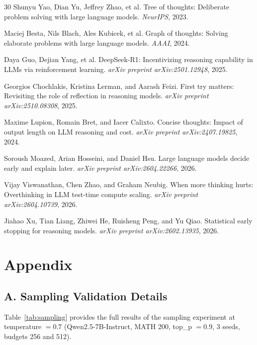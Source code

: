 \documentclass{article}
\begin{document}
\begin{thebibliography}{30}
Shunyu Yao, Dian Yu, Jeffrey Zhao, et al.
\newblock Tree of thoughts: Deliberate problem solving with large language models.
\newblock \emph{NeurIPS}, 2023.

Maciej Besta, Nils Blach, Ales Kubicek, et al.
\newblock Graph of thoughts: Solving elaborate problems with large language models.
\newblock \emph{AAAI}, 2024.

Daya Guo, Dejian Yang, et al.
\newblock DeepSeek-R1: Incentivizing reasoning capability in LLMs via reinforcement learning.
\newblock \emph{arXiv preprint arXiv:2501.12948}, 2025.

Georgios Chochlakis, Kristina Lerman, and Aarash Feizi.
\newblock First try matters: Revisiting the role of reflection in reasoning models.
\newblock \emph{arXiv preprint arXiv:2510.08308}, 2025.

Maxime Lupion, Romain Bret, and Iacer Calixto.
\newblock Concise thoughts: Impact of output length on LLM reasoning and cost.
\newblock \emph{arXiv preprint arXiv:2407.19825}, 2024.

Soroush Moazed, Arian Hosseini, and Daniel Hsu.
\newblock Large language models decide early and explain later.
\newblock \emph{arXiv preprint arXiv:2604.22266}, 2026.

Vijay Viswanathan, Chen Zhao, and Graham Neubig.
\newblock When more thinking hurts: Overthinking in LLM test-time compute scaling.
\newblock \emph{arXiv preprint arXiv:2604.10739}, 2026.

Jiahao Xu, Tian Liang, Zhiwei He, Ruisheng Peng, and Yu Qiao.
\newblock Statistical early stopping for reasoning models.
\newblock \emph{arXiv preprint arXiv:2602.13935}, 2026.

\end{thebibliography}

\section*{Appendix}

\subsection*{A. Sampling Validation Details}

Table~\ref{tab:sampling} provides the full results of the sampling experiment at temperature $= 0.7$ (Qwen2.5-7B-Instruct, MATH 200, top\_p $= 0.9$, 3 seeds, budgets 256 and 512).
\end{document}

